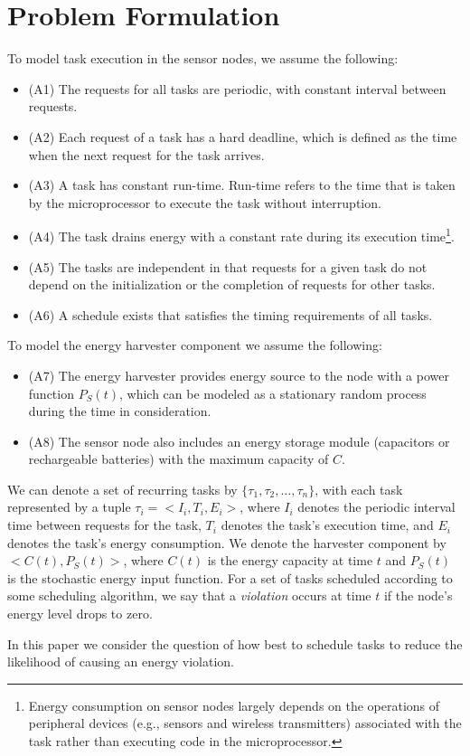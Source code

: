\section{ Problem Formulation} \label{sec:problem}

To model task execution in the sensor nodes, we assume the following: 
\begin{itemize}
	\item (A1) The requests for all tasks are periodic, with constant interval between requests. 
	\item (A2) Each request of a task has a hard deadline, which is defined as the time when the next request for the task arrives. 
	\item (A3) A task has constant run-time. Run-time refers to the time that  is taken by the microprocessor to execute the task without interruption.
	\item (A4) The task drains energy with a constant rate during its execution time\footnote{Energy consumption on sensor nodes largely depends on the operations of peripheral devices (e.g., sensors and wireless transmitters) associated with the task rather than executing code in the microprocessor.}.       
	\item (A5) The tasks are independent in that requests for a given task do not depend on the initialization or the completion of requests for other tasks.
	\item (A6) A schedule exists that satisfies the timing requirements of all tasks.
\end{itemize}

To model the energy harvester component we assume the following:
 \begin{itemize}
	\item (A7) The energy harvester provides energy source to the node with a power function $P_S(t)$, which can be modeled as a stationary random process during the time in consideration.
	\item (A8) The sensor node also includes an energy storage module (capacitors or rechargeable batteries) with the maximum capacity of $C$. 
\end{itemize}
 
We can denote a set of recurring tasks by $\{\tau_1, \tau_2, \ldots, \tau_n\}$, with each task represented by a tuple $\tau_i = <I_i, T_i, E_i>$, where $I_i$ denotes the periodic interval time between requests for the task, $T_i$ denotes the task's execution time, and $E_i$ denotes the task's energy consumption. We denote the harvester component by $<C(t), P_S(t)>$, where $C(t)$ is the energy capacity at time $t$ and $P_S(t)$ is the stochastic energy input function. For a set of tasks scheduled according to some scheduling algorithm, we say that a \textit{violation} occurs at time $t$ if the node's energy level drops to zero.

In this paper we consider the question of how best to schedule tasks to reduce the likelihood of causing an energy violation.
